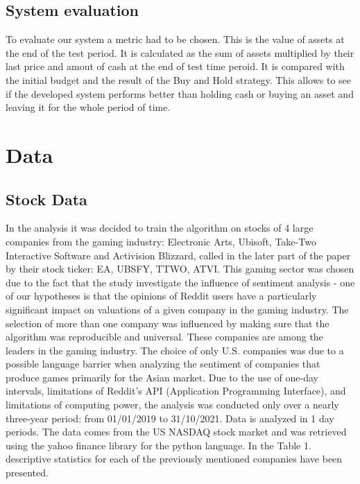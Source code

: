 \documentclass[11pt]{article} %
\begin{document}
\subsection{System evaluation}
To evaluate our system a metric had to be chosen. This is the value of assets at the end of the test period. It is calculated as the sum of assets multiplied by their last price and amout of cash at the end of test time peroid. It is compared with the initial budget and the result of the Buy and Hold strategy. This allows to see if the developed system performs better than holding cash or buying an asset and leaving it for the whole period of time. 

\section{Data}
\subsection{Stock Data}
In the analysis it was decided to train the algorithm on stocks of 4 large companies from the gaming industry: Electronic Arts, Ubisoft, Take-Two Interactive Software and Activision Blizzard, called in the later part of the paper by their stock ticker: EA, UBSFY, TTWO, ATVI. This gaming sector was chosen due to the fact that the study investigate the influence of sentiment analysis - one of our hypotheses is that the opinions of Reddit users have a particularly significant impact on valuations of a given company in the gaming industry.  The selection of more than one company was influenced by making sure that the algorithm was reproducible and universal. These companies are among the leaders in the gaming industry. The choice of only U.S. companies was due to a possible language barrier when analyzing the sentiment of companies that produce games primarily for the Asian market. Due to the use of one-day intervals, limitations of Reddit's API (Application Programming Interface), and limitations of computing power, the analysis was conducted only over a nearly three-year period: from 01/01/2019 to 31/10/2021. Data is analyzed in 1 day periods. The data comes from the US NASDAQ stock market and was retrieved using the yahoo finance library for the python language. In the Table 1. descriptive statistics for each of the previously mentioned companies have been presented. 
\end{document}
